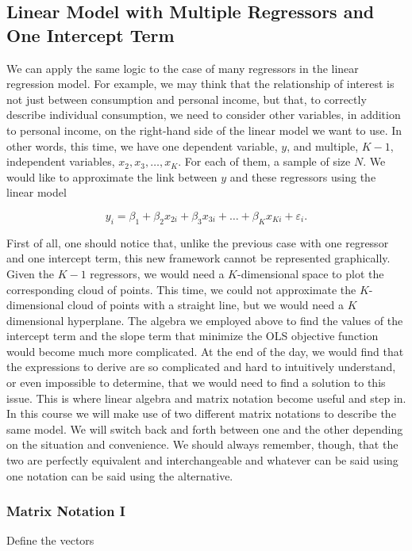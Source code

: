\subsection{Linear Model with Multiple Regressors and One Intercept Term}
We can apply the same logic to the case of many regressors in the linear regression model. For example, we may think that the relationship of interest is not just between consumption and personal income, but that, to correctly describe individual consumption, we need to consider other variables, in addition to personal income, on the right-hand side of the linear model we want to use. In other words, this time, we have one dependent variable, $y$, and multiple, $K-1$, independent variables, $x_{2}, x_{3}, \ldots, x_{K}$. For each of them, a sample of size $N$. We would like to approximate the link between $y$ and these regressors using the linear model

$$
y_{i}=\beta_{1}+\beta_{2} x_{2 i}+\beta_{3} x_{3 i}+\ldots+\beta_{K} x_{K i}+\varepsilon_{i} .
$$

First of all, one should notice that, unlike the previous case with one regressor and one intercept term, this new framework cannot be represented graphically. Given the $K-1$ regressors, we would need a $K$-dimensional space to plot the corresponding cloud of points. This time, we could not approximate the $K$-dimensional cloud of points with a straight line, but we would need a $K$ dimensional hyperplane. The algebra we employed above to find the values of the intercept term and the slope term that minimize the OLS objective function would become much more complicated. At the end of the day, we would find that the expressions to derive are so complicated and hard to intuitively understand, or even impossible to determine, that we would need to find a solution to this issue. This is where linear algebra and matrix notation become useful and step in. In this course we will make use of two different matrix notations to describe the same model. We will switch back and forth between one and the other depending on the situation and convenience. We should always remember, though, that the two are perfectly equivalent and interchangeable and whatever can be said using one notation can be said using the alternative.

\subsubsection{Matrix Notation I}
Define the vectors

